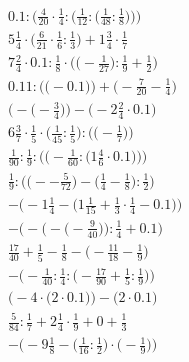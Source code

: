 \documentclass[8pt]{article}
\begin{document}
\begin{align}
0.1 : \bigg(\frac{4}{20} \cdot \frac{1}{4} : \Big(\frac{1}{12} : \big(\frac{1}{48} : \frac{1}{8}\big)\Big)\bigg) \\
5\frac{1}{4} \cdot \big(\frac{6}{21} \cdot \frac{1}{6} : \frac{1}{3}\big) + 1\frac{3}{4} \cdot \frac{1}{7} \\
7\frac{2}{4} \cdot 0.1 : \frac{1}{8} \cdot \Big(\big(-\frac{1}{27}\big) : \frac{1}{9} + \frac{1}{2}\Big) \\
0.11 : \Big(\big(-0.1\big)\Big) + \Big(-\frac{7}{20} - \frac{1}{4}\Big) \\
\Big(-\big(-\frac{3}{4}\big)\Big) - \Big(-2\frac{2}{4} \cdot 0.1\Big) \\
6\frac{3}{7} \cdot \frac{1}{5} \cdot \Big(\frac{1}{45} : \frac{1}{5}\Big) : \Big(\big(-\frac{1}{7}\big)\Big) \\
\frac{1}{90} : \frac{1}{9} : \bigg(\Big(-\frac{1}{60} : \big(1\frac{4}{6} \cdot 0.1\big)\Big)\bigg) \\
\frac{1}{9} : \Big(\big(--\frac{5}{72}\big) - \big(\frac{1}{4} - \frac{1}{8}\big) : \frac{1}{2}\Big) \\
-\Big(-1\frac{1}{4} - \big(1\frac{1}{15} + \frac{1}{3} \cdot \frac{1}{4} - 0.1\big)\Big) \\
-\bigg(-\Big(-\big(-\frac{9}{40}\big)\Big) : \frac{1}{4} + 0.1\bigg) \\
\frac{17}{40} + \frac{1}{5} - \frac{1}{8} - \big(-\frac{11}{18} - \frac{1}{9}\big) \\
-\Big(-\frac{1}{40} : \frac{1}{4} : \big(-\frac{17}{90} + \frac{1}{5} : \frac{1}{9}\big)\Big) \\
\Big(-4 \cdot \big(2 \cdot 0.1\big)\Big) - \Big(2 \cdot 0.1\Big) \\
\frac{5}{84} : \frac{1}{7} + 2\frac{1}{4} \cdot \frac{1}{9} + 0 + \frac{1}{3} \\
-\Big(-9\frac{1}{8} - \big(\frac{1}{16} : \frac{1}{2}\big) \cdot \big(-\frac{1}{9}\big)\Big)
\end{align}
\end{document}
